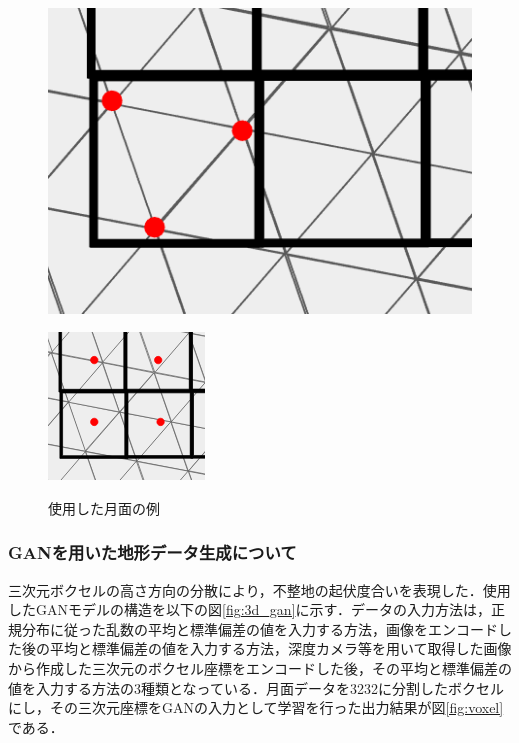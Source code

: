 \documentclass[uplatex,twocolumn, dvipdfmx]{jsarticle}  %
\begin{document}
\begin{figure}[b]
  \centering
  \begin{minipage}[b]{0.37\linewidth}
    \centering
    \includegraphics[keepaspectratio, scale=0.2]{images/mesh1.png}
    \label{fig:mesh1}
  \end{minipage}
  \begin{minipage}[b]{0.35\linewidth}
    \centering
    \includegraphics[keepaspectratio, scale=0.45]{images/mesh2.png}
    \label{fig:mesh2}
  \end{minipage}
  \caption{使用した月面の例}\label{fig:mesh_point}
\end{figure}


\subsubsection{GANを用いた地形データ生成について}
三次元ボクセルの高さ方向の分散により，不整地の起伏度合いを表現した．使用したGANモデルの構造を以下の図\ref{fig:3d_gan}に示す．データの入力方法は，正規分布に従った乱数の平均と標準偏差の値を入力する方法，画像をエンコードした後の平均と標準偏差の値を入力する方法，深度カメラ等を用いて取得した画像から作成した三次元のボクセル座標をエンコードした後，その平均と標準偏差の値を入力する方法の3種類となっている．月面データを32\times32に分割したボクセルにし，その三次元座標をGANの入力として学習を行った出力結果が図\ref{fig:voxel}である．
\end{document}
